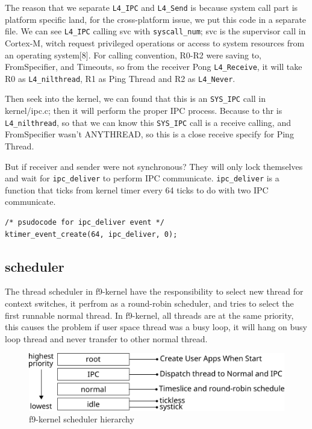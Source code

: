 \documentclass[10pt,preprint,nocopyrightspace]{sigplanconf}
\begin{document}
The reason that we separate \texttt{L4\_IPC} and \texttt{L4\_Send} is because system call part is platform specific land, for the cross-platform issue, we put this code in a separate file. We can see \texttt{L4\_IPC} calling svc with \texttt{syscall\_num}; svc is the supervisor call in Cortex-M, witch request privileged operations or access to system resources from an operating system[8]. For calling convention, R0-R2 were saving to, FromSpecifier, and Timeouts, so from the receiver Pong \texttt{L4\_Receive}, it will take R0 as \texttt{L4\_nilthread}, R1 as Ping Thread and R2 as \texttt{L4\_Never}.
		
Then seek into the kernel, we can found that this is an \texttt{SYS\_IPC} call in kernel/ipc.c; then it will perform the proper IPC process. Because to thr is \texttt{L4\_nilthread}, so that we can know this \texttt{SYS\_IPC} call is a receive calling, and FromSpecifier wasn't ANYTHREAD, so this is a close receive specify for Ping Thread.
	
But if receiver and sender were not synchronous? They will only lock themselves and wait for \texttt{ipc\_deliver} to perform IPC communicate. \texttt{ipc\_deliver} is a function that ticks from kernel timer every 64 ticks to do with two IPC communicate.

\begin{lstlisting}[basicstyle=\small,frame=single]
/* psudocode for ipc_deliver event */
ktimer_event_create(64, ipc_deliver, 0);
\end{lstlisting}

\subsection{scheduler}

The thread scheduler in f9-kernel have the responsibility to select new thread for context switches, it perfrom as a round-robin scheduler, and tries to select the first runnable normal thread. In f9-kernel, all threads are at the same priority, this causes the problem if user space thread was a busy loop, it will hang on busy loop thread and never transfer to other normal thread.

\begin{figure}[H]
	\begin{center}
		\includegraphics[width=\linewidth]{picture/scheduler.png}
	\end{center}
	\caption{f9-kernel scheduler hierarchy}
\end{figure}
\end{document}
